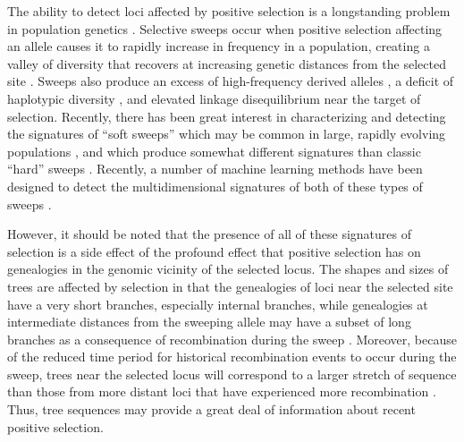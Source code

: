 The ability to detect loci affected by positive selection is a longstanding problem in population genetics \cite{stephanSelectiveSweeps2019}. Selective sweeps occur when positive selection affecting an allele causes it to rapidly increase in frequency in a population, creating a valley of diversity that recovers at increasing genetic distances from the selected site \cite{kaplanHitchhikingEffectRevisited1989,smithHitchhikingEffectFavourable1974}. Sweeps also produce an excess of high-frequency derived alleles \cite{fayHitchhikingPositiveDarwinian2000}, a deficit of haplotypic diversity \cite{fayHitchhikingPositiveDarwinian2000,hudsonEvidencePositiveSelection1994,sabetiDetectingRecentPositive2002}, and elevated linkage disequilibrium \cite{kellyTestNeutralityBased1997,kimLinkageDisequilibriumSignature2004} near the target of selection. Recently, there has been great interest in characterizing and detecting the signatures of “soft sweeps” \cite{hermissonSoftSweepsMolecular2005} which may be common in large, rapidly evolving populations \cite{garudRecentSelectiveSweeps2015,hermissonSoftSweepsMolecular2005,karasovEvidenceThatAdaptation2010}, and which produce somewhat different signatures than classic “hard” sweeps \cite{bergCoalescentModelSweep2015,przeworskiSignaturePositiveSelection2005}. Recently, a number of machine learning methods have been designed to detect the multidimensional signatures of both of these types of sweeps \cite{caldasInferenceSelectiveSweep2022,hejaseDeepLearningApproachInference2022,lauterburVersatileDetectionDiverse2022,mughalLocalizingClassifyingAdaptive2019,pybusHierarchicalBoostingMachinelearning2015,schriderHICRobustIdentification2016,whitehouseTimesweeperAccuratelyIdentifying2022,whitehouseTimesweeperAccuratelyIdentifying2023}. 

However, it should be noted that the presence of all of these signatures of selection is a side effect of the profound effect that positive selection has on genealogies in the genomic vicinity of the selected locus. The shapes and sizes of trees are affected by selection in that the genealogies of loci near the selected site have a very short branches, especially internal branches, while genealogies at intermediate distances from the sweeping allele may have a subset of long branches as a consequence of recombination during the sweep \cite{fayHitchhikingPositiveDarwinian2000,przeworskiSignaturePositiveSelection2005,stephanSelectiveSweeps2019}. Moreover, because of the reduced time period for historical recombination events to occur during the sweep, trees near the selected locus will correspond to a larger stretch of sequence than those from more distant loci that have experienced more recombination \cite{degiorgioSpatiallyAwareLikelihood2022,ferrer-admetllaDetectingIncompleteSoft2014,przeworskiSignaturePositiveSelection2005,sabetiDetectingRecentPositive2002}. Thus, tree sequences may provide a great deal of information about recent positive selection. 

